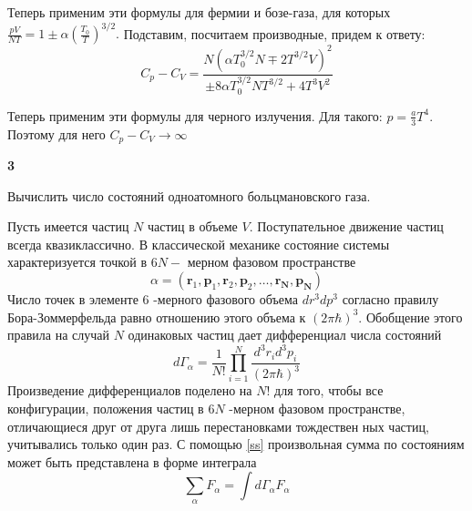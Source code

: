 \documentclass[a4paper,12pt]{article} %
\begin{document}
\begin{task}
Теперь применим эти формулы для фермии и бозе-газа, для которых $ \frac{pV}{NT}=1\pm \alpha\left(\frac{T_0}{T}\right)^{3/2}.$ Подставим, посчитаем производные, придем к ответу:
\[ C_p-C_V =\frac{N(\alpha T_0^{3/2}N \mp 2 T^{3/2} V)^2 }{\pm 8 \alpha T_0^{3/2} N T^{3/2}+4 T^3 V^2 } \] 





Теперь применим эти формулы для черного излучения. Для такого: $ p=\frac{a}{3} T^4$. Поэтому для него $ C_p-C_V\rightarrow\infty $
 


\end{task}


\begin{task}\textbf{3}

Вычислить число состояний одноатомного больцмановского газа.

Пусть имеется частиц $N$ частиц в объеме $V$. 
Поступательное движение частиц всегда квазиклассично. 
В классической механике состояние системы характеризуется точкой в $6 N-$ мерном фазовом пространстве
\begin{equation}\label{ss}
\alpha=
\left(\mathbf{r}_{1}, \mathbf{p}_{1}, \mathbf{r}_{2}, \mathbf{p}_{2}, \ldots, \mathbf{r}_{\mathbf{N}}, \mathbf{p}_{\mathbf{N}}\right)
\end{equation}
Число точек в элементе 6 -мерного фазового объема $d r^{3} d p^{3}$ согласно правилу Бора-Зоммерфельда равно отношению этого объема к $(2 \pi \hbar)^{3} .$ 
Обобщение этого правила на случай $N$ одинаковых частиц дает дифференциал числа состояний
$$
d \Gamma_{\alpha}=\frac{1}{N !} \prod_{i=1}^{N} \frac{d^{3} r_{i} d^{3} p_{i}}{(2 \pi \hbar)^{3}}
$$
Произведение дифференциалов поделено на $N !$ для того, чтобы все конфигурации, положения частиц в $6 N$ -мерном фазовом пространстве, 
отличающиеся друг от друга лишь перестановками тождествен ных частиц, учитывались только один раз. 
С помощью \ref{ss} произвольная сумма по состояниям может быть представлена в форме интеграла
$$
\sum_{\alpha} F_{\alpha}=\int d \Gamma_{\alpha} F_{\alpha}
$$



\end{task}
\end{document}
